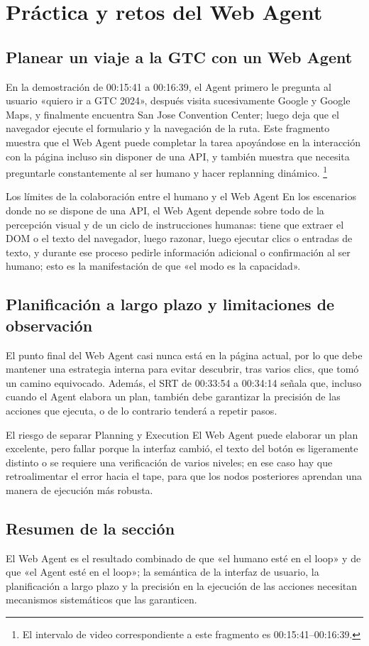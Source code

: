 \section{Práctica y retos del Web Agent}
\subsection{Planear un viaje a la GTC con un Web Agent}
En la demostración de 00:15:41 a 00:16:39, el Agent primero le pregunta al usuario «quiero ir a GTC 2024», después visita sucesivamente Google y Google Maps, y finalmente encuentra San Jose Convention Center; luego deja que el navegador ejecute el formulario y la navegación de la ruta. Este fragmento muestra que el Web Agent puede completar la tarea apoyándose en la interacción con la página incluso sin disponer de una API, y también muestra que necesita preguntarle constantemente al ser humano y hacer replanning dinámico.
\footnote{El intervalo de video correspondiente a este fragmento es 00:15:41--00:16:39.}

\begin{importantbox}{Los límites de la colaboración entre el humano y el Web Agent}
En los escenarios donde no se dispone de una API, el Web Agent depende sobre todo de la percepción visual y de un ciclo de instrucciones humanas: tiene que extraer el DOM o el texto del navegador, luego razonar, luego ejecutar clics o entradas de texto, y durante ese proceso pedirle información adicional o confirmación al ser humano; esto es la manifestación de que «el modo es la capacidad».
\end{importantbox}

\subsection{Planificación a largo plazo y limitaciones de observación}
El punto final del Web Agent casi nunca está en la página actual, por lo que debe mantener una estrategia interna para evitar descubrir, tras varios clics, que tomó un camino equivocado. Además, el SRT de 00:33:54 a 00:34:14 señala que, incluso cuando el Agent elabora un plan, también debe garantizar la precisión de las acciones que ejecuta, o de lo contrario tenderá a repetir pasos.

\begin{warningbox}{El riesgo de separar Planning y Execution}
El Web Agent puede elaborar un plan excelente, pero fallar porque la interfaz cambió, el texto del botón es ligeramente distinto o se requiere una verificación de varios niveles; en ese caso hay que retroalimentar el error hacia el tape, para que los nodos posteriores aprendan una manera de ejecución más robusta.
\end{warningbox}

\subsection{Resumen de la sección}
El Web Agent es el resultado combinado de que «el humano esté en el loop» y de que «el Agent esté en el loop»; la semántica de la interfaz de usuario, la planificación a largo plazo y la precisión en la ejecución de las acciones necesitan mecanismos sistemáticos que las garanticen.

